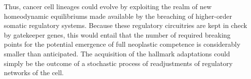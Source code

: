 Thus, cancer cell lineages could evolve by exploiting the realm of new
homeodynamic equilibriums made available by the breaching of higher-order
somatic regulatory systems.  Because these regulatory circuitries are kept in
check by gatekeeper genes, this would entail that the number of required
breaking points for the potential emergence of full neoplastic competence is
considerably smaller than anticipated. The acquisition of the hallmark
adaptations could simply be the outcome of a stochastic process of readjustments
of regulatory networks of the cell.



